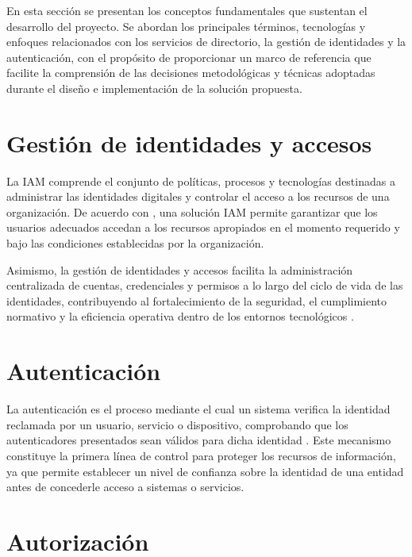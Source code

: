 \label{cap:marco_conceptual}
\vspace*{0.7cm}

En esta sección se presentan los conceptos fundamentales que sustentan el desarrollo del proyecto. Se abordan los principales términos, tecnologías y enfoques relacionados con los servicios de directorio, la gestión de identidades y la autenticación, con el propósito de proporcionar un marco de referencia que facilite la comprensión de las decisiones metodológicas y técnicas adoptadas durante el diseño e implementación de la solución propuesta.

\section{Gestión de identidades y accesos}

La \ac{IAM} comprende el conjunto de políticas, procesos y tecnologías destinadas a administrar las identidades digitales y controlar el acceso a los recursos de una organización. De acuerdo con \citet{MatthewKosinski}, una solución \ac{IAM} permite garantizar que los usuarios adecuados accedan a los recursos apropiados en el momento requerido y bajo las condiciones establecidas por la organización.

Asimismo, la gestión de identidades y accesos facilita la administración centralizada de cuentas, credenciales y permisos a lo largo del ciclo de vida de las identidades, contribuyendo al fortalecimiento de la seguridad, el cumplimiento normativo y la eficiencia operativa dentro de los entornos tecnológicos \citep{MatthewKosinski}.

\section{Autenticación}

La autenticación es el proceso mediante el cual un sistema verifica la identidad reclamada por un usuario, servicio o dispositivo, comprobando que los autenticadores presentados sean válidos para dicha identidad \citep{NIST80063v4}. Este mecanismo constituye la primera línea de control para proteger los recursos de información, ya que permite establecer un nivel de confianza sobre la identidad de una entidad antes de concederle acceso a sistemas o servicios.

\section{Autorización}

